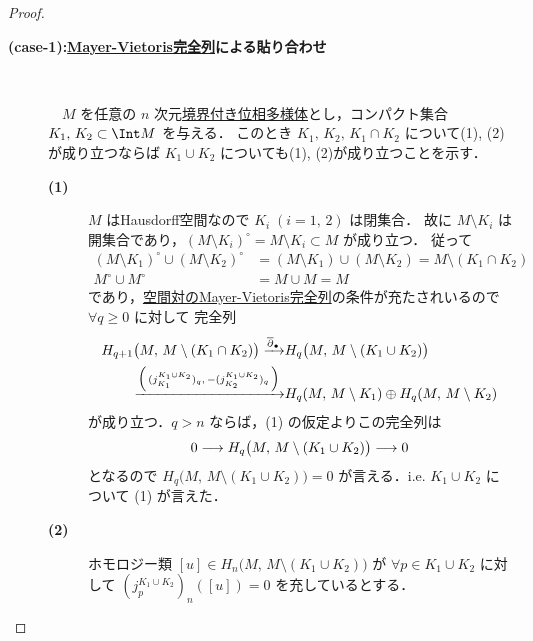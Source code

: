 \documentclass[algtopo_main]{subfiles}
\begin{document}
\begin{proof}
    \begin{description}
        \item[\textbf{(case-1):\hyperref[thm:MV-rel]{Mayer-Vietoris完全列}による貼り合わせ}]　
        
        　$M$ を任意の $n$ 次元\hyperref[def:mani-with-boundary]{境界付き位相多様体}とし，コンパクト集合 $K_1,\, K_2 \subset \Int M$ を与える．
        このとき $K_1,\, K_2,\, K_1 \cap K_2$ について(1), (2)が成り立つならば $K_1 \cup K_2$ についても(1), (2)が成り立つことを示す．

        \begin{description}
            \item[\textbf{(1)}] 
            $M$ はHausdorff空間なので $K_i\; (i=1,\, 2)$ は閉集合．
            故に $M \setminus K_i$ は開集合であり，$(M \setminus K_i)^\circ = M \setminus K_i \subset M$ が成り立つ．
            従って
            \begin{align}
                (M \setminus K_1)^\circ \cup (M \setminus K_2)^\circ &= (M\setminus K_1) \cup (M\setminus K_2) = M \setminus (K_1 \cap K_2) \\
                M^\circ \cup M^\circ &= M \cup M = M
            \end{align}
            であり，\hyperref[thm:MV-rel]{空間対のMayer-Vietoris完全列}の条件が充たされいるので
            $\forall q \ge 0$ に対して
            完全列
            \begin{align}
                \label{eq:lem-fundamental-class-MV}
                H_{q+1} \bigl(M,\, M \setminus (K_1 \cap K_2)\bigr) \xrightarrow{\overline{\partial}_\bullet} &H_q \bigl( M,\, M \setminus (K_1 \cup K_2) \bigr) \\
                \xrightarrow{\Bigl(\, (j_{K_1}^{K_1 \cup K_2})_q,\, -(j_{K_2}^{K_1 \cup K_2})_q\,\Bigr)} &H_q (M,\, M \setminus K_1) \oplus H_q(M,\, M \setminus K_2)
            \end{align}
            が成り立つ．$q > n$ ならば，(1) の仮定よりこの完全列は
            \begin{align}
                0 \longrightarrow H_q \bigl( M,\, M \setminus (K_1 \cup K_2) \bigr)
                \longrightarrow 0
            \end{align}
            となるので $H_q \bigl( M,\, M \setminus (K_1 \cup K_2) \bigr) = 0$ が言える．i.e. $K_1 \cup K_2$ について (1) が言えた．    
            \item[\textbf{(2)}] 
            ホモロジー類 $[u] \in H_n\bigl(M,\, M \setminus (K_1 \cup K_2)\bigr)$ が $\forall p \in K_1 \cup K_2$ に対して $(j^{K_1 \cup K_2}_{p})_n ([u]) = 0$ を充しているとする．

\end{description}
\end{description}
\end{proof}
\end{document}
